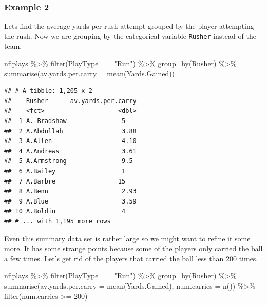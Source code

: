 \documentclass[
]{book}
\newenvironment{Shaded}{\begin{snugshade}}{\end{snugshade}}
\newcommand{\AttributeTok}[1]{\textcolor[rgb]{0.77,0.63,0.00}{#1}}
\newcommand{\DecValTok}[1]{\textcolor[rgb]{0.00,0.00,0.81}{#1}}
\newcommand{\FunctionTok}[1]{\textcolor[rgb]{0.00,0.00,0.00}{#1}}
\newcommand{\NormalTok}[1]{#1}
\newcommand{\SpecialCharTok}[1]{\textcolor[rgb]{0.00,0.00,0.00}{#1}}
\newcommand{\StringTok}[1]{\textcolor[rgb]{0.31,0.60,0.02}{#1}}
\theoremstyle{definition}
\theoremstyle{definition}
\theoremstyle{definition}
\theoremstyle{definition}
\theoremstyle{remark}
\begin{document}
\hypertarget{example-2}{%
\subsubsection{Example 2}\label{example-2}}

Lets find the average yards per rush attempt grouped by the player attempting the rush. Now we are grouping by the categorical variable \texttt{Rusher} instead of the team.

\begin{Shaded}
\begin{Highlighting}[]
\NormalTok{nflplays }\SpecialCharTok{\%\textgreater{}\%}
    \FunctionTok{filter}\NormalTok{(PlayType }\SpecialCharTok{==} \StringTok{"Run"}\NormalTok{) }\SpecialCharTok{\%\textgreater{}\%}
    \FunctionTok{group\_by}\NormalTok{(Rusher) }\SpecialCharTok{\%\textgreater{}\%}
    \FunctionTok{summarise}\NormalTok{(}\AttributeTok{av.yards.per.carry =} \FunctionTok{mean}\NormalTok{(Yards.Gained))}
\end{Highlighting}
\end{Shaded}

\begin{verbatim}
## # A tibble: 1,205 x 2
##    Rusher      av.yards.per.carry
##    <fct>                    <dbl>
##  1 A. Bradshaw              -5   
##  2 A.Abdullah                3.88
##  3 A.Allen                   4.10
##  4 A.Andrews                 3.61
##  5 A.Armstrong               9.5 
##  6 A.Bailey                  1   
##  7 A.Barbre                 15   
##  8 A.Benn                    2.93
##  9 A.Blue                    3.59
## 10 A.Boldin                  4   
## # ... with 1,195 more rows
\end{verbatim}

Even this summary data set is rather large so we might want to refine it some more. It has some strange points because some of the players only carried the ball a few times. Let's get rid of the players that carried the ball less than 200 times.

\begin{Shaded}
\begin{Highlighting}[]
\NormalTok{nflplays }\SpecialCharTok{\%\textgreater{}\%}
    \FunctionTok{filter}\NormalTok{(PlayType }\SpecialCharTok{==} \StringTok{"Run"}\NormalTok{) }\SpecialCharTok{\%\textgreater{}\%}
    \FunctionTok{group\_by}\NormalTok{(Rusher) }\SpecialCharTok{\%\textgreater{}\%}
    \FunctionTok{summarise}\NormalTok{(}\AttributeTok{av.yards.per.carry =} \FunctionTok{mean}\NormalTok{(Yards.Gained), }\AttributeTok{num.carries =} \FunctionTok{n}\NormalTok{()) }\SpecialCharTok{\%\textgreater{}\%}
    \FunctionTok{filter}\NormalTok{(num.carries }\SpecialCharTok{\textgreater{}=} \DecValTok{200}\NormalTok{)}
\end{Highlighting}
\end{Shaded}
\end{document}
